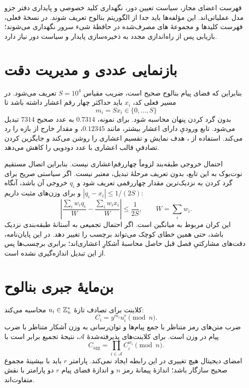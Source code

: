 فهرست اعضای مجاز، سیاست تعیین دور، نگهداری کلید خصوصی و پایداری دفتر  جزو مدل عملیاتی‌اند. این مؤلفه‌ها باید جدا از الگوریتم بنالوح تعریف شوند. در نسخۀ فعلی، فهرست کلیدها و مجموعۀ های مصرف‌شده در حافظۀ شیء سرور نگهداری می‌شوند؛ بازیابی پس از راه‌اندازی مجدد به ذخیره‌سازی پایدار و سیاست دور نیاز دارد.

\section{بازنمایی عددی و مدیریت دقت}
\label{sec:fixed-point}
بنابراین که فضای پیام بنالوح صحیح است، ضریب مقیاس $S=10^4$ تعریف می‌شود. در مسیر فعلی کد، $x_i$ باید حداکثر چهار رقم اعشار داشته باشد تا
\begin{equation}
m_i=Sx_i\in\{0,\ldots,S\}
\label{eq:fixed-point}
\end{equation}
بدون گرد کردن پنهان محاسبه شود. برای نمونه، $0.7314$ به عدد صحیح $7314$ تبدیل می‌شود. تابع  ورودیِ دارای اعشار بیشتر، مانند $0.12345$، و مقدار خارج از بازه را رد می‌کند. استفاده از ، هدف نمایش و تقسیم اعشاری را روشن می‌کند و جایگزین کردن تصادفیِ قالب اعشاری با عدد دودویی را کاهش می‌دهد.

احتمال خروجی طبقه‌بند لزوماً چهاررقم‌اعشاری نیست. بنابراین اتصال مستقیم نوت‌بوک به این تابع، بدون تعریف مرحلۀ تبدیل، معتبر نیست. اگر سیاستی صریح برای گرد کردن به نزدیک‌ترین مقدار چهاررقمی تعریف شود و $q_i$ خروجی آن باشد، آنگاه $|q_i-x_i|\le1/(2S)$ و برای وزن‌های مثبت داریم:
\begin{equation}
\left|\frac{\sum_iw_iq_i}{W}-\frac{\sum_iw_ix_i}{W}\right|
\le\frac{1}{2S},\qquad W=\sum_iw_i.
\label{eq:quantization-bound}
\end{equation}
این کران مربوط به میانگین است. اگر احتمال تجمیعی به آستانۀ طبقه‌بندی نزدیک باشد، حتی همین خطای کوچک می‌تواند برچسب را تغییر دهد. در این پایان‌نامه، دقت‌های مشارکتیِ فصل قبل حاصل محاسبۀ آشکارِ اعشاری‌اند؛ برابری برچسب‌ها پس از این تبدیل اندازه‌گیری نشده است.

\section{بن‌مایۀ جبری بنالوح}
کلاینت برای تصادف تازۀ $u_i\in\mathbb{Z}_n^*$ محاسبه می‌کند:
\begin{equation}
C_i=y^{m_i}u_i^r\pmod n.
\end{equation}
ضرب متن‌های رمز متناظر با جمع پیام‌ها و توان‌رسانی به وزن آشکار متناظر با ضرب پیام در وزن است. برای کلاینت‌های پذیرفته‌شدۀ $\mathcal A$، نتیجۀ تجمیع برابر است با
\begin{equation}
C_{\mathrm{agg}}=\prod_{i\in\mathcal A}C_i^{w_i}\pmod n.
\label{eq:sbhe-aggregate}
\end{equation}
امضای دیجیتال هیچ تغییری در این رابطه ایجاد نمی‌کند. پارامتر $r$ باید با بیشینۀ مجموع صحیح سازگار باشد؛ اندازۀ پیمانۀ رمز $n$ و اندازۀ فضای پیام $r$ دو پارامتر با نقش متفاوت‌اند.

